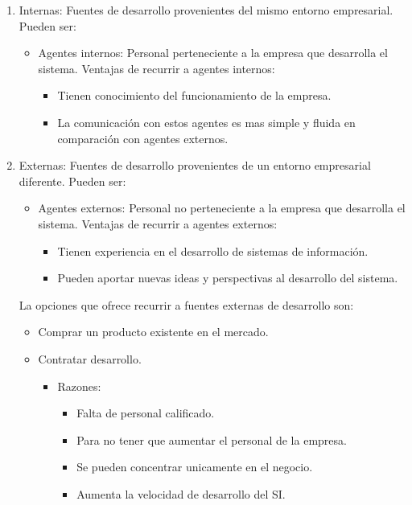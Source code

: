 \documentclass{templateNote}
\begin{document}
\begin{enumerate}
    \item Internas: Fuentes de desarrollo provenientes del mismo entorno empresarial. Pueden ser:
    \begin{itemize}
        \item Agentes internos: Personal perteneciente a la empresa que desarrolla el sistema. Ventajas de recurrir a agentes internos:
        \begin{itemize}
            \item Tienen conocimiento del funcionamiento de la empresa.
            \item La comunicación con estos agentes es mas simple y fluida en comparación con agentes externos. 
        \end{itemize}
    \end{itemize}
    \newpage
    \item Externas: Fuentes de desarrollo provenientes de un entorno empresarial diferente. Pueden ser:
    \begin{itemize}
        \item Agentes externos: Personal no perteneciente a la empresa que desarrolla el sistema. Ventajas de recurrir a agentes externos:
        \begin{itemize}
            \item Tienen experiencia en el desarrollo de sistemas de información.
            \item Pueden aportar nuevas ideas y perspectivas al desarrollo del sistema.
        \end{itemize}
    \end{itemize}
    La opciones que ofrece recurrir a fuentes externas de desarrollo son:
    \begin{itemize}
        \item Comprar un producto existente en el mercado.
        \item Contratar desarrollo.
        \begin{itemize}
            \item Razones:
            \begin{itemize}
                \item Falta de personal calificado.
                \item Para no tener que aumentar el personal de la empresa.
                \item Se pueden concentrar unicamente en el negocio.
                \item Aumenta la velocidad de desarrollo del SI.

\end{itemize}
\end{itemize}
\end{itemize}
\end{enumerate}
\end{document}
